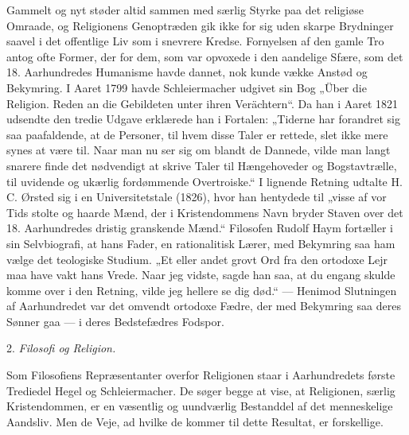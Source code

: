 \documentclass[12pt,a4paper,openany]{book}
\newcommand{\opage}[1]{\marginnote{\footnotesize\textit{[#1]}}}
\newcommand{\sectionhead}[2]{\par\bigskip\phantomsection\begin{center}#1 \textit{#2}\end{center}\addcontentsline{toc}{section}{#1 #2}\medskip\ignorespaces}
\begin{document}
Gammelt og nyt støder altid sammen med særlig Styrke paa det
religiøse Omraade, og Religionens Genoptræden gik ikke for sig uden
skarpe Brydninger saavel i det offentlige Liv som i snevrere Kredse.
Fornyelsen af den gamle Tro antog ofte Former, der for dem, som
var opvoxede i den aandelige Sfære, som det 18. Aarhundredes Humanisme
havde dannet, nok kunde vække Anstød og Bekymring. I
Aaret 1799 havde Schleiermacher udgivet sin Bog „Über die Religion.
\opage{124}Reden an die Gebildeten unter ihren Verächtern“. Da han i Aaret 1821
udsendte den tredie Udgave erklærede han i Fortalen: „Tiderne har
forandret sig saa paafaldende, at de Personer, til hvem disse Taler
er rettede, slet ikke mere synes at være til. Naar man nu ser sig om
blandt de Dannede, vilde man langt snarere finde det nødvendigt at
skrive Taler til Hængehoveder og Bogstavtrælle, til uvidende og
ukærlig fordømmende Overtroiske.“ I lignende Retning udtalte H. C.
Ørsted sig i en Universitetstale (1826), hvor han hentydede til „visse
af vor Tids stolte og haarde Mænd, der i Kristendommens Navn bryder
Staven over det 18. Aarhundredes dristig granskende Mænd.“
Filosofen Rudolf Haym fortæller i sin Selvbiografi, at hans Fader,
en rationalitisk Lærer, med Bekymring saa ham vælge det teologiske
Studium. „Et eller andet grovt Ord fra den ortodoxe Lejr maa
have vakt hans Vrede. Naar jeg vidste, sagde han saa, at du engang
skulde komme over i den Retning, vilde jeg hellere se dig død.“
--- Henimod Slutningen af Aarhundredet var det omvendt ortodoxe
Fædre, der med Bekymring saa deres Sønner gaa --- i deres Bedstefædres
Fodspor.

\sectionhead{2.}{Filosofi og Religion.}

Som Filosofiens Repræsentanter overfor Religionen staar i Aarhundredets
første Trediedel Hegel og Schleiermacher. De søger begge
at vise, at Religionen, særlig Kristendommen, er en væsentlig og uundværlig
Bestanddel af det menneskelige Aandsliv. Men de Veje, ad
hvilke de kommer til dette Resultat, er forskellige.
\end{document}
